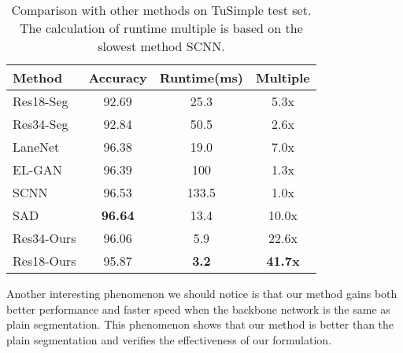 \documentclass[runningheads]{llncs}
\begin{document}
\begin{table}[h]
	\vspace{-10pt}
	\centering
	\caption{Comparison with other methods on TuSimple test set. The calculation of runtime multiple is based on the slowest method SCNN.}
	\label{tab:Tusimple compare}
	\begin{tabular}{lccc}
		\toprule
		Method  & Accuracy & Runtime(ms) & Multiple \\ \midrule
		Res18-Seg \cite{chen2017deeplab}& 92.69    & 25.3        &   5.3x       \\
		Res34-Seg \cite{chen2017deeplab} & 92.84    & 50.5        &   2.6x      \\
		LaneNet \cite{End-to-End}  & 96.38    & 19.0        &   7.0x      \\
		EL-GAN \cite{ghafoorian2018gan}    & 96.39    & 100        &   1.3x   \\
		SCNN \cite{SCNN}    & 96.53    & 133.5       &   1.0x       \\
		SAD \cite{SAD}      & \textbf{96.64}    & 13.4        &   10.0x     \\
\midrule
		Res34-Ours      & 96.06    & 5.9        &   22.6x     \\ 
		Res18-Ours      & 95.87    & \textbf{3.2}         &   \textbf{41.7x}     \\ 
		
		\bottomrule
	\end{tabular}
	\vspace{-10pt}
\end{table}



Another interesting phenomenon we should notice is that our method gains both better performance and faster speed when the backbone network is the same as plain segmentation. This phenomenon shows that our method is better than the plain segmentation and verifies the effectiveness of our formulation.
\end{document}
